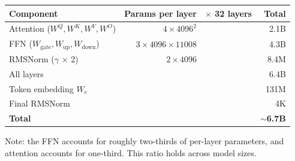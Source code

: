 \documentclass[11pt,a4paper]{article}
\begin{document}
\begin{center}
\begin{tabular}{lrrr}
\toprule
\textbf{Component} & \textbf{Params per layer} & \textbf{$\times$ 32 layers} & \textbf{Total} \\
\midrule
Attention ($W^Q, W^K, W^V, W^O$) & $4 \times 4096^2$ & & 2.1B \\
FFN ($W_{\text{gate}}, W_{\text{up}}, W_{\text{down}}$) & $3 \times 4096 \times 11008$ & & 4.3B \\
RMSNorm ($\gamma$ $\times$ 2) & $2 \times 4096$ & & 8.4M \\
\midrule
All layers & & & 6.4B \\
Token embedding $W_e$ & & & 131M \\
Final RMSNorm & & & 4K \\
\midrule
\textbf{Total} & & & $\sim$\textbf{6.7B} \\
\bottomrule
\end{tabular}
\end{center}

Note: the FFN accounts for roughly two-thirds of per-layer parameters, and attention
accounts for one-third. This ratio holds across model sizes.
\end{document}
